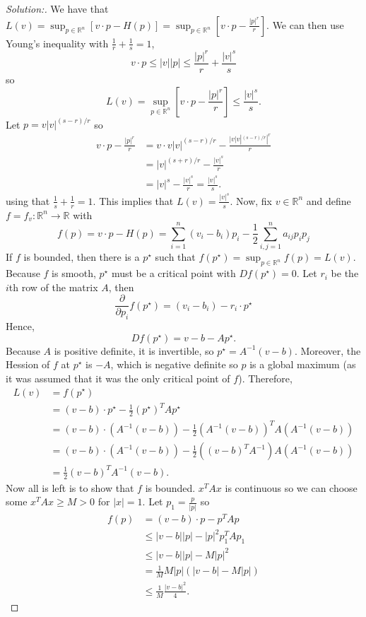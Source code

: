 \documentclass{article}
\newcommand{\R}{\mathbb{R}}
\begin{document}
    \begin{proof}[Solution:]
      We have that $L(v) = \sup_{p\in \R^n}[v\cdot p - H(p)] = \sup_{p\in\R^n} \left[v\cdot p - \frac{|p|^r}{r}\right].$
      We can then use Young's inequality with $\frac{1}{r}+\frac{1}{s}=1$,
      \[v\cdot p \le |v||p| \le \frac{|p|^r}{r} + \frac{|v|^s}{s}\]
      so 
      \[L(v) = \sup_{p\in\R^n}\left[v\cdot p - \frac{|p|^r}{r}\right] \le \frac{|v|^s}{s}.\]
      Let $p = v|v|^{(s-r)/r}$ so 
      \begin{align*}
        v\cdot p - \frac{|p|^r}{r} &= v\cdot v|v|^{(s-r)/r} - \frac{|v|v|^{(s-r)/r}|^r}{r} \\
        &= |v|^{(s+r)/r} - \frac{|v|^s}{r} \\
        &= |v|^s - \frac{|v|^s}{r} = \frac{|v|^s}{s}.
      \end{align*}
      using that $\frac{1}{s} + \frac{1}{r} = 1$. This implies that $L(v) = \frac{|v|^s}{s}$.\newline
      Now, fix $v\in \R^n$ and define $f = f_v : \R^n \to \R$ with 
      \[f(p) = v\cdot p - H(p) = \sum_{i=1}^n(v_i - b_i)p_i - \frac{1}{2}\sum_{i,j=1}^n a_{ij}p_ip_j\]
      If $f$ is bounded, then there is a $p^\star$ such that $f(p^\star) = \sup_{p\in\R^n} f(p) = L(v)$. Because $f$ is smooth, $p^\star$ must be a critical point with $Df(p^\star) = 0$. Let $r_i$ be the $i$th row of the matrix $A$, then 
      \[\frac{\partial}{\partial p_i} f(p^\star) = (v_i - b_i) - r_i\cdot p^\star\]
      Hence, 
      \[Df(p^\star) = v - b - Ap^\star.\]
      Because $A$ is positive definite, it is invertible, so $p^\star = A^{-1}(v-b)$. Moreover, the Hession of $f$ at $p^\star$ is $-A$, which is negative definite so $p$ is a global maximum (as it was assumed that it was the only critical point of $f$). Therefore, 
      \begin{align*}
        L(v) &= f(p^\star) \\
        &= (v-b)\cdot p^\star - \frac{1}{2}(p^\star)^T A p^\star \\
        &= (v-b)\cdot(A^{-1}(v-b)) - \frac{1}{2}(A^{-1}(v-b))^T A (A^{-1}(v-b)) \\
        &= (v-b)\cdot(A^{-1}(v-b)) - \frac{1}{2}((v-b)^TA^{-1}) A (A^{-1}(v-b)) \\
        &= \frac{1}{2}(v-b)^TA^{-1}(v-b).
      \end{align*}
      Now all is left is to show that $f$ is bounded.\newline
      $x^T A x$ is continuous so we can choose some $x^T A x \ge M > 0$ for $|x| = 1$. Let $p_1 = \frac{p}{|p|}$ so 
      \begin{align*}
        f(p) &= (v-b)\cdot p - p^T A p \\
        &\le |v-b||p| - |p|^2 p_1^T A p_1 \\
        &\le|v-b||p| - M|p|^2\\
        &= \frac{1}{M}M|p|(|v-b| - M|p|)\\
        &\le \frac{1}{M}\frac{|v-b|^2}{4}.
      \end{align*}
    \end{proof}
\end{document}

